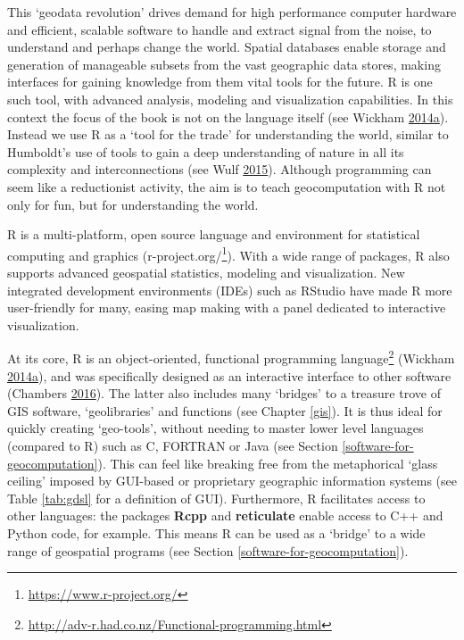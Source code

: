 \documentclass[]{krantz}
\let\rmarkdownfootnote\footnote%
\def\footnote{\protect\rmarkdownfootnote}
\renewcommand{\href}[2]{#2\footnote{\url{#1}}}
\begin{document}
This `geodata revolution' drives demand for high performance computer hardware and efficient, scalable software to handle and extract signal from the noise, to understand and perhaps change the world.
Spatial databases enable storage and generation of manageable subsets from the vast geographic data stores, making interfaces for gaining knowledge from them vital tools for the future.
R is one such tool, with advanced analysis, modeling and visualization capabilities.
In this context the focus of the book is not on the language itself (see Wickham \protect\hyperlink{ref-wickham_advanced_2014}{2014}\protect\hyperlink{ref-wickham_advanced_2014}{a}).
Instead we use R as a `tool for the trade' for understanding the world, similar to Humboldt's use of tools to gain a deep understanding of nature in all its complexity and interconnections (see Wulf \protect\hyperlink{ref-wulf_invention_2015}{2015}).
Although programming can seem like a reductionist activity, the aim is to teach geocomputation with R not only for fun, but for understanding the world.

R is a multi-platform, open source language and environment for statistical computing and graphics (\href{https://www.r-project.org/}{r-project.org/}).
With a wide range of packages, R also supports advanced geospatial statistics, modeling and visualization.
New integrated development environments (IDEs) such as RStudio have made R more user-friendly for many, easing map making with a panel dedicated to interactive visualization.

At its core, R is an object-oriented, \href{http://adv-r.had.co.nz/Functional-programming.html}{functional programming language} (Wickham \protect\hyperlink{ref-wickham_advanced_2014}{2014}\protect\hyperlink{ref-wickham_advanced_2014}{a}), and was specifically designed as an interactive interface to other software (Chambers \protect\hyperlink{ref-chambers_extending_2016}{2016}).
The latter also includes many `bridges' to a treasure trove of GIS software, `geolibraries' and functions (see Chapter \ref{gis}).
It is thus ideal for quickly creating `geo-tools', without needing to master lower level languages (compared to R) such as C, FORTRAN or Java (see Section \ref{software-for-geocomputation}).
This can feel like breaking free from the metaphorical `glass ceiling' imposed by GUI-based or proprietary geographic information systems (see Table \ref{tab:gdsl} for a definition of GUI).
Furthermore, R facilitates access to other languages:
the packages \textbf{Rcpp} and \textbf{reticulate} enable access to C++ and Python code, for example.
This means R can be used as a `bridge' to a wide range of geospatial programs (see Section \ref{software-for-geocomputation}).
\end{document}
